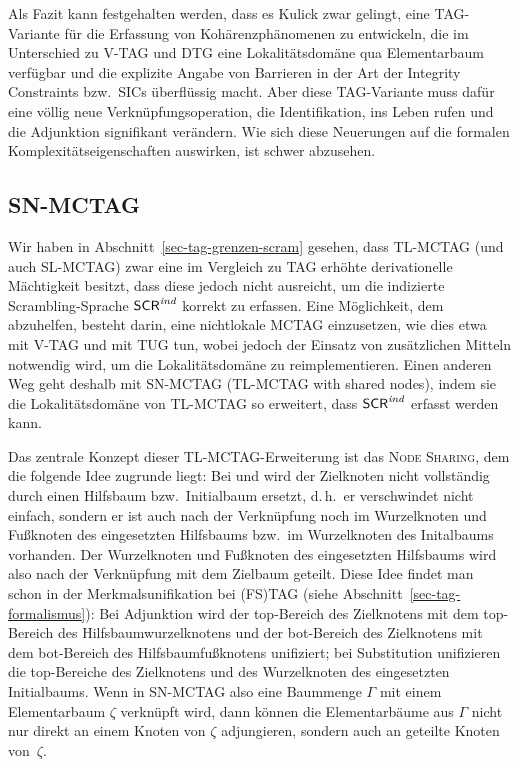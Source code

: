Als Fazit kann festgehalten werden, dass es Kulick zwar gelingt, eine TAG-Variante für die Erfassung von Kohärenzphänomenen zu entwickeln, die im Unterschied zu V-TAG und DTG eine Lokalitätsdomäne qua Elementarbaum verfügbar und die explizite Angabe von Barrieren in der Art der Integrity Constraints bzw.\ SICs überflüssig macht. Aber diese TAG-Variante muss dafür eine völlig neue Verknüpfungsoperation, die Identifikation, ins Leben rufen und die Adjunktion signifikant verändern. Wie sich diese Neuerungen auf die formalen Komplexitätseigenschaften auswirken, ist schwer abzusehen.


\subsection{SN-MCTAG}\label{sec-snmctag}

Wir haben in Abschnitt~\ref{sec-tag-grenzen-scram} gesehen, dass TL-MCTAG (und auch SL-MCTAG) zwar eine im Vergleich zu TAG erhöhte derivationelle Mächtigkeit besitzt, dass diese jedoch nicht ausreicht, um die indizierte Scrambling-Sprache  $\mathsf{SCR}^{\mathit{ind}}$ korrekt zu erfassen. Eine Möglichkeit, dem abzuhelfen, besteht darin, eine nichtlokale MCTAG einzusetzen, wie dies etwa \cite{Rambow:94} mit V-TAG und \cite{Gerdes:04} mit TUG tun, wobei jedoch der Einsatz von zusätzlichen Mitteln notwendig wird, um die Lokalitätsdomäne zu reimplementieren. Einen anderen Weg geht deshalb \cite{Kallmeyer:05} mit SN-MCTAG (TL-MCTAG with shared nodes), indem sie die Lokalitätsdomäne von TL-MCTAG so erweitert, dass $\mathsf{SCR}^{\mathit{ind}}$ erfasst werden kann. 
 
Das zentrale Konzept dieser TL-MCTAG-Erweiterung ist das \textsc{Node Sharing}, dem die folgende Idee zugrunde liegt: Bei  und  wird der Zielknoten nicht vollständig durch einen Hilfsbaum bzw.\ Initialbaum ersetzt, d.\,h.\ er verschwindet nicht einfach, sondern er ist auch nach der Verknüpfung noch im Wurzelknoten und Fu\ss knoten des eingesetzten Hilfsbaums bzw.\ im Wurzelknoten des Initalbaums vorhanden. Der Wurzelknoten und Fu\ss knoten des eingesetzten Hilfsbaums wird also nach der Verknüpfung mit dem Zielbaum geteilt. Diese Idee findet man schon in der Merkmalsunifikation bei (FS)TAG (siehe Abschnitt~\ref{sec-tag-formalismus}): Bei Adjunktion wird der {\sc top}-Bereich des Zielknotens mit dem {\sc top}-Bereich des Hilfsbaumwurzelknotens und der {\sc bot}-Bereich des Zielknotens mit dem {\sc bot}-Bereich des Hilfsbaumfu\ss knotens unifiziert; bei Substitution unifizieren die {\sc top}-Bereiche des Zielknotens und des Wurzelknoten des eingesetzten Initialbaums. Wenn in SN-MCTAG also eine Baummenge $\Gamma$ mit einem Elementarbaum $\zeta$ verknüpft wird, dann können die Elementarbäume aus $\Gamma$ nicht nur direkt an einem Knoten von $\zeta$ adjungieren, sondern auch an geteilte Knoten von~$\zeta$. 

